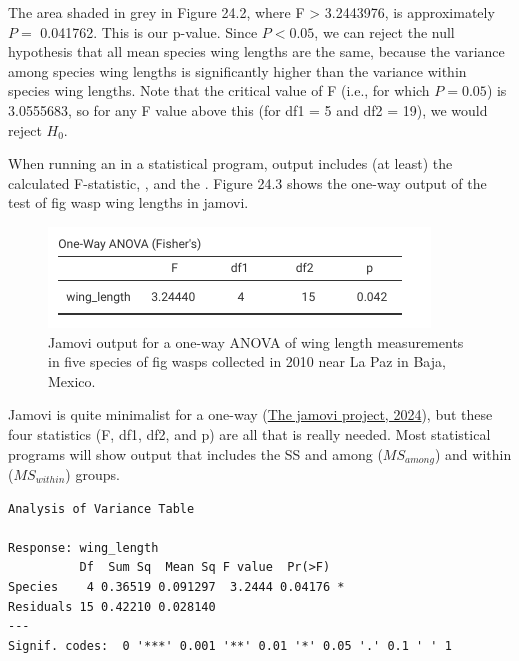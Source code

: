 \documentclass[
  openany]{krantz}
\begin{document}
\newpage

The area shaded in grey in Figure 24.2, where F \textgreater{} 3.2443976, is approximately \(P =\) 0.041762.
This is our p-value.
Since \(P < 0.05\), we can reject the null hypothesis that all mean species wing lengths are the same, because the variance among species wing lengths is significantly higher than the variance within species wing lengths.
Note that the critical value of F (i.e., for which \(P = 0.05\)) is 3.0555683, so for any F value above this (for df1 = 5 and df2 = 19), we would reject \(H_{0}\).

When running an  in a statistical program, output includes (at least) the calculated F-statistic, , and the .
Figure 24.3 shows the one-way  output of the test of fig wasp wing lengths in jamovi.

\begin{figure}
\includegraphics[width=1\linewidth]{img/jamovi_ANOVA_output} \caption{Jamovi output for a one-way ANOVA of wing length measurements in five species of fig wasps collected in 2010 near La Paz in Baja, Mexico.}\label{fig:unnamed-chunk-101}
\end{figure}

Jamovi is quite minimalist for a one-way  (\protect\hyperlink{ref-Jamovi2022}{The jamovi project, 2024}), but these four statistics (F, df1, df2, and p) are all that is really needed.
Most statistical programs will show  output that includes the SS and  among (\(MS_{among}\)) and within (\(MS_{within}\)) groups.

\begin{verbatim}
Analysis of Variance Table

Response: wing_length
          Df  Sum Sq  Mean Sq F value  Pr(>F)  
Species    4 0.36519 0.091297  3.2444 0.04176 *
Residuals 15 0.42210 0.028140                  
---
Signif. codes:  0 '***' 0.001 '**' 0.01 '*' 0.05 '.' 0.1 ' ' 1
\end{verbatim}
\end{document}
